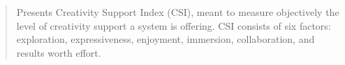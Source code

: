 			
		\begin{quote}
		\small
		Presents Creativity Support Index (CSI), meant to measure objectively the level of 
		creativity support a system is offering. CSI consists of six factors:
		exploration,
		expressiveness,
		enjoyment,
		immersion,
		collaboration, and
		results worth effort.
		\end{quote}


\newpage

\newpage
\printbibliography %

% 

% 
%
%
%

